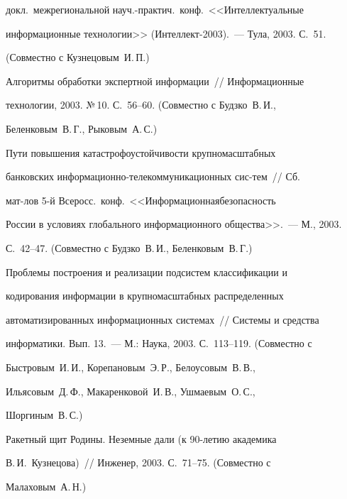 докл.\ межрегиональной науч.-практич.\ конф.\ <<Интеллектуальные


информационные технологии>> (Интеллект-2003).~--- Тула, 2003. С.~51.


(Совместно с Кузнецовым~И.\,П.)





 Алгоритмы обработки экспертной информации~// Информационные


технологии, 2003. №\,10. С.~56--60. (Со\-вмест\-но с Будз\-ко~В.\,И.,


Беленковым~В.\,Г., Рыковым~А.\,С.)





 Пути повышения катастрофоустойчивости крупномасштабных


банковских информационно-телекоммуникационных сис-\linebreak тем~// Сб.\


мат-лов 5-й Всеросс.\ конф.\ <<Информационная\linebreak безопас\-ность


России в условиях глобального информационного общества>>.~--- М., 2003.


С.~42--47. (Совместно с Будз\-ко~В.\,И., Беленковым~В.\,Г.)





 Проблемы построения и реализации подсистем классификации и


кодирования информации в крупномасштабных распределенных


автоматизированных информационных системах~// Системы и средства


информатики. Вып. 13.~--- М.: Наука, 2003. С.~113--119. (Совместно с


Быстровым~И.\,И., Корепановым~Э.\,Р., Белоусовым~В.\,В.,


Ильясовым~Д.\,Ф., Макаренковой~И.\,В., Ушмаевым~О.\,С.,


Шоргиным~В.\,С.)


\pagebreak





 Ракетный щит Родины. Неземные дали (к 90-ле\-тию академика


В.\,И.~Кузнецова)~// Инженер, 2003. С.~71--75. (Совместно с


Малаховым~А.\,Н.)






